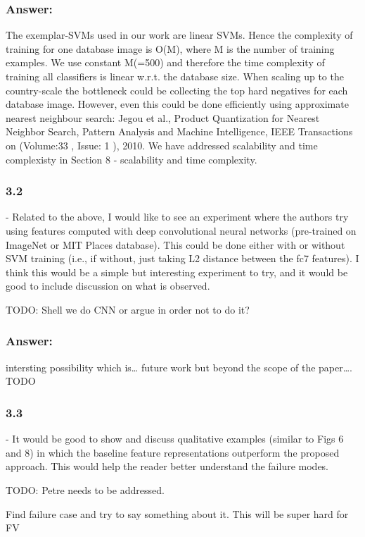 \documentclass[a4paper,12pt]{article}
\begin{document}
\subsubsection*{Answer:}
The exemplar-SVMs used in our work are linear SVMs. Hence the complexity of training for one database image is O(M), where M is the number of training examples. We use constant M(=500) and therefore the time complexity of training all classifiers is linear w.r.t. the database size. When scaling up to the country-scale the bottleneck could be collecting the top hard negatives for each database image. However, even this could be done efficiently using approximate nearest neighbour search:
Jegou et al., Product Quantization for Nearest Neighbor Search, Pattern Analysis and Machine Intelligence, IEEE Transactions on  (Volume:33 ,  Issue: 1 ), 2010. We have addressed scalability and time complexisty in Section 8 - scalability and time complexity. 


\subsubsection*{3.2}
- Related to the above, I would like to see an experiment where the authors try using features computed with deep convolutional neural networks (pre-trained on ImageNet or MIT Places database). This could be done either with or without SVM training (i.e., if without, just taking L2 distance between the fc7 features). I think this would be a simple but interesting experiment to try, and it would be good to include discussion on what is observed.

TODO:
Shell we do CNN or argue in order not to do it?
\subsubsection*{Answer:}
intersting possibility which is… future work but beyond the scope of the paper…. TODO

\subsubsection*{3.3}
- It would be good to show and discuss qualitative examples (similar to Figs 6 and 8) in which the baseline feature representations outperform the proposed approach. This would help the reader better understand the failure modes.

TODO: Petre needs to be addressed.

Find failure case and try to say something about it. This will be super hard for FV
\end{document}
